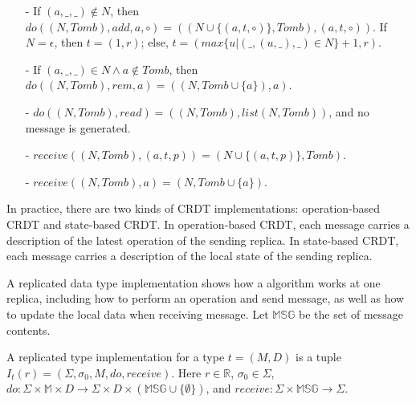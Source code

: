 \begin{example}[RGA]
\begin{itemize}
\item[-] If $(a,\_,\_) \notin N$, then $\mathit{do}((N,\mathit{Tomb}),\mathit{add},a,\circ) = ((N \cup \{ (a,t,\circ) \},\mathit{Tomb}),(a,t,\circ))$. If $N = \epsilon$, then $t = (1,r)$; else, $t = (\mathit{max}\{ u \vert (\_,(u,\_),\_) \in N \}+1,r)$.

\item[-] If $(a,\_,\_) \in N \wedge a \notin \mathit{Tomb}$, then $\mathit{do}((N,\mathit{Tomb}),\mathit{rem},a) = ((N,\mathit{Tomb} \cup \{ a \} ),a)$.

\item[-] $\mathit{do}((N,\mathit{Tomb}),\mathit{read}) = ((N,\mathit{Tomb}),\mathit{list}(N,\mathit{Tomb}))$, and no message is generated.

\item[-] $\mathit{receive}((N,\mathit{Tomb}),(a,t,p)) = (N \cup \{ (a,t,p) \},\mathit{Tomb})$.

\item[-] $\mathit{receive}((N,\mathit{Tomb}),a) = (N,\mathit{Tomb} \cup \{ a \})$.
\end{itemize}
\end{example}















In practice, there are two kinds of CRDT implementations: operation-based CRDT and state-based CRDT. In operation-based CRDT, each message carries a description of the latest operation of the sending replica. In state-based CRDT, each message carries a description of the local state of the sending replica.





A replicated data type implementation shows how a algorithm works at one replica, including how to perform an operation and send message, as well as how to update the local data when receiving message. Let $\mathbb{MSG}$ be the set of message contents.

\begin{definition}
\label{definition:replicated type implementation}
A replicated type implementation for a type $t = (M,D)$ is a tuple $I_t(r) = (\Sigma, \sigma_0, M, \mathit{do},\mathit{receive})$. Here $r \in \mathbb{R}$, $\sigma_0 \in \Sigma$, $\mathit{do}:\Sigma \times \mathbb{M} \times D \rightarrow \Sigma \times D \times (\mathbb{MSG} \cup \{ \emptyset \} )$, and $\mathit{receive}: \Sigma \times \mathbb{MSG} \rightarrow \Sigma$.
\end{definition}

